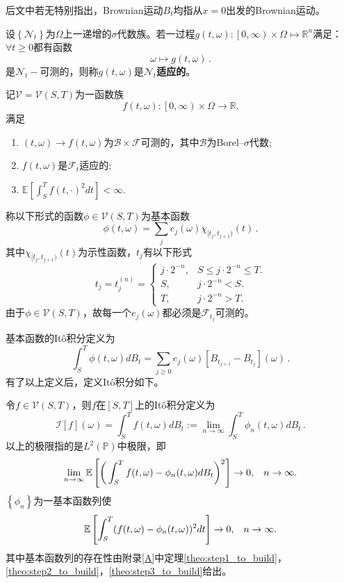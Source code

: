 \documentclass[oneside]{sysuthesis}
\begin{document}
后文中若无特别指出，Brownian运动$B_t$均指从$x=0$出发的Brownian运动。

\begin{definition}\label{def:adaption}
	设$\left\{\mathcal{N}_t\right\}$为$\Omega$上一递增的$\sigma$代数族。若一过程$g(t,\omega):\left[0,\infty\right)\times\Omega\mapsto\mathbb{R}^n$满足：$\forall t\ge 0 $都有函数
	\[
	\omega\mapsto g(t,\omega)\,.
	\]
	是$\mathcal{N}_t-$可测的，则称$g(t,\omega)$是\textbf{$\mathcal{N}_t$适应的}。
\end{definition}

\begin{definition}\label{def:V_family}
	记$\mathcal{V}=\mathcal{V}(S,T)$为一函数族
	\[
	f(t,\omega):\left[0,\infty\right)\times\Omega\to\mathbb{R}.
	\]
	满足
	\begin{enumerate}[label=(\arabic*)]
		\item $(t,\omega)\to f(t,\omega)$为$\mathcal{B}\times\mathcal{F}$可测的，其中$\mathcal{B}$为Borel--$\sigma$代数;
		\item $f(t,\omega)$是$\mathcal{F}_t$适应的;
		\item $\mathbb{E}\left[ \int_{S}^{T}f(t,\cdot)^2 dt\right]<\infty$.
	\end{enumerate}
\end{definition}

\begin{definition}[基本函数]\label{def:fundmental_func}
	称以下形式的函数$\phi\in\mathcal{V}(S,T)$为基本函数
	\[
	\phi(t,\omega)=\sum_j e_j(\omega)\chi_{[t_j,t_{j+1})}(t)\,.
	\]
	其中$\chi_{[t_j,t_{j+1})}(t)$为示性函数，$t_j$有以下形式
	\[
	t_j=t_j^{(n)}=
	\begin{cases}
		j\cdot2^{-n},& S\le j\cdot2^{-n}\le T.\\
		S,& j\cdot2^{-n}< S.\\
		T,& j\cdot2^{-n}> T.
	\end{cases}
	\]
	由于$\phi\in\mathcal{V}(S,T)$，故每一个$e_j(\omega)$都必须是$\mathcal{F}_{t_j}$可测的。
\end{definition}

基本函数的It\^o积分定义为
\[
\int_{S}^{T}\phi(t,\omega)dB_t=\sum_{j\ge0}e_j(\omega)[B_{t_{j+1}}-B_{t_j}](\omega)\,.
\]
有了以上定义后，定义It\^o积分如下。

\begin{definition}[It\^o积分]\label{def:Ito_int}
	令$f\in\mathcal{V}(S,T)$，则$f$在$[S,T]$上的It\^o积分定义为
	\[
	\mathcal{I}[f](\omega)=\int_{S}^{T}f(t,\omega)dB_t:=\lim_{n\to\infty}\int_{S}^{T}\phi_n(t,\omega)dB_t\,.
	\]
	以上的极限指的是$L^2(\mathbb{P})$中极限，即
	\[
	\lim_{n\to\infty}\mathbb{E}\left[\bigg(\int_{S}^{T}f(t,\omega)-\phi_n(t,\omega)dB_t\bigg)^2\right]\to 0,\hspace{0.3cm}n\to\infty.
	\]
	$\left\{\phi_n\right\}$为一基本函数列使
	\[
	\mathbb{E}\left[\int_{S}^{T}(f(t,\omega)-\phi_n(t,\omega))^2 dt\right]\to 0,\hspace{0.3cm}n\to\infty.
	\]
	其中基本函数列的存在性由附录\ref{A}中定理\ref{theo:step1_to_build}，\ref{theo:step2_to_build}，\ref{theo:step3_to_build}给出。
\end{definition}
\end{document}
